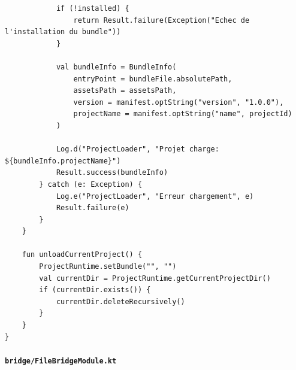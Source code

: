 \documentclass[11pt]{article}
\begin{document}
\begin{verbatim}
            if (!installed) {
                return Result.failure(Exception("Echec de l'installation du bundle"))
            }

            val bundleInfo = BundleInfo(
                entryPoint = bundleFile.absolutePath,
                assetsPath = assetsPath,
                version = manifest.optString("version", "1.0.0"),
                projectName = manifest.optString("name", projectId)
            )

            Log.d("ProjectLoader", "Projet charge: ${bundleInfo.projectName}")
            Result.success(bundleInfo)
        } catch (e: Exception) {
            Log.e("ProjectLoader", "Erreur chargement", e)
            Result.failure(e)
        }
    }

    fun unloadCurrentProject() {
        ProjectRuntime.setBundle("", "")
        val currentDir = ProjectRuntime.getCurrentProjectDir()
        if (currentDir.exists()) {
            currentDir.deleteRecursively()
        }
    }
}
\end{verbatim}

\paragraph{\texttt{bridge/FileBridgeModule.kt}}
\end{document}
